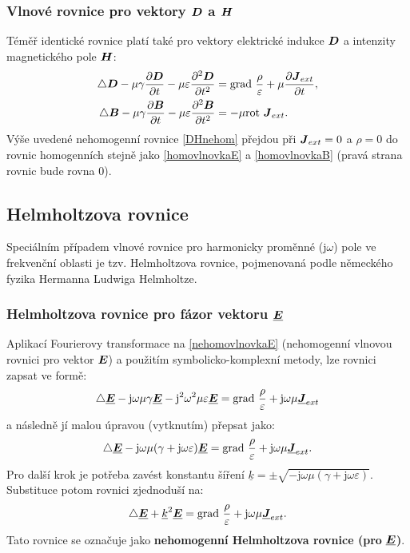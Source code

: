 \documentclass[12pt,a4paper,oneside]{article}
\numberwithin{equation}{section} %
\numberwithin{figure}{section} %
\numberwithin{table}{section} %
\newcommand{\mj}{\mathrm{j}} %
\renewcommand{\vec}[1]{\mbox{\boldmath$#1$}} %
\newcommand{\faz}[1]{{\underline{#1}}} %
\newcommand{\grad}{\mathrm{grad}\ }
\newcommand{\rot}{\mathrm{rot}\ }
\begin{document}
\subsubsection*{Vlnové rovnice pro vektory $\vec{D}$ a $\vec{H}$}
Téměř identické rovnice platí také pro vektory elektrické indukce $\vec{D}$ a intenzity magnetického pole $\vec{H}$:
\begin{subequations}
\label{DHnehom}
\begin{align}
\triangle \vec{D} - \mu \gamma \frac{\partial \vec{D}}{\partial t} - \mu \varepsilon \frac{\partial ^2 \vec{D}}{\partial t ^2} &= \grad \frac{\rho}{\varepsilon} + \mu \frac{\partial \vec{J} _{ext}}{\partial t} ,
\\
\triangle \vec{B} - \mu \gamma \frac{\partial \vec{B}}{\partial t} - \mu \varepsilon \frac{\partial ^2 \vec{B}}{\partial t ^2} &= - \mu \rot \vec{J} _{ext}.
\end{align}
\end{subequations}
Výše uvedené nehomogenní rovnice \ref{DHnehom} přejdou při $\vec{J} _{ext} = 0$ a $\rho = 0$ do rovnic homogenních stejně jako \ref{homovlnovkaE} a \ref{homovlnovkaB} (pravá strana rovnic bude rovna 0).



\subsection{Helmholtzova rovnice}
Speciálním případem vlnové rovnice pro harmonicky proměnné ($\mj \omega$) pole ve frekvenční oblasti je tzv. Helmholtzova rovnice, pojmenovaná podle německého fyzika Hermanna Ludwiga Helmholtze.

\subsubsection*{Helmholtzova rovnice pro fázor vektoru $\faz{\vec{E}}$}
Aplikací Fourierovy transformace na \ref{nehomovlnovkaE} (nehomogenní vlnovou rovnici pro vektor $\vec{E}$) a použitím symbolicko-komplexní metody, lze rovnici zapsat ve formě:
\begin{equation}
\triangle \faz{\vec{E}} - \mj \omega \mu \gamma \faz{\vec{E}} - \mj ^2 \omega ^2 \mu \varepsilon \faz{\vec{E}} = \grad \frac{\rho}{\varepsilon} + \mj \omega \mu \faz{\vec{J}} _{ext}
\end{equation}
a následně jí malou úpravou (vytknutím) přepsat jako:
\begin{equation}
\triangle \faz{\vec{E}} - \mj \omega \mu (\gamma + \mj \omega \varepsilon) \faz{\vec{E}} = \grad \frac{\rho}{\varepsilon} + \mj \omega \mu \faz{\vec{J}} _{ext} .
\end{equation}
Pro další krok je potřeba zavést konstantu šíření $\faz{k} = \pm \sqrt{- \mj \omega \mu (\gamma + \mj \omega \varepsilon)}$. Substituce potom rovnici zjednoduší na:
\begin{equation}
\label{HelmholtzEnehomo}
\triangle \faz{\vec{E}} + \faz{k} ^2 \faz{\vec{E}} = \grad \frac{\rho}{\varepsilon} + \mj \omega \mu \faz{\vec{J}} _{ext} .
\end{equation}
Tato rovnice se označuje jako \textbf{nehomogenní Helmholtzova rovnice (pro} $\faz{\vec{E}}$\textbf{)}.
\end{document}
